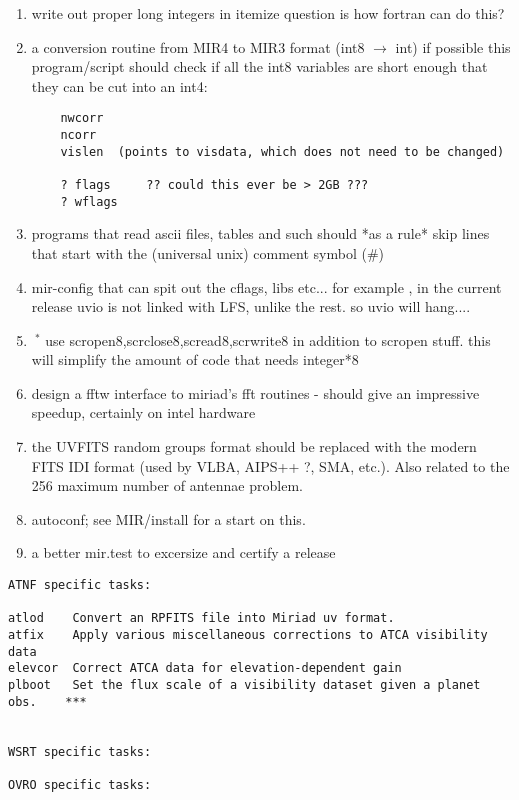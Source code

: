 \begin{enumerate}
\item
write out proper long integers in itemize
question is how fortran can do this?

\item
a conversion routine from MIR4 to MIR3 format (int8 $\rightarrow$ int) if possible
this program/script should check if all the int8 variables are short
enough that they can be cut into an int4:

\begin{verbatim}
	nwcorr
	ncorr
	vislen	(points to visdata, which does not need to be changed)
	
	? flags		?? could this ever be > 2GB ???
	? wflags
\end{verbatim}

\item
programs that read ascii files, tables and such should *as a rule*
skip lines that start with the (universal unix) comment symbol (\#)

\item
mir-config that can spit out the cflags, libs etc...
for example , in the current release uvio  is not linked with LFS,
unlike the rest. so uvio will hang....

\item
$\ ^{*}$
use scropen8,scrclose8,scread8,scrwrite8 in addition to scropen stuff.
this will simplify the amount of code that needs integer*8



\item
design a fftw interface to miriad's fft routines - should give an impressive
speedup, certainly on intel hardware

\item
the UVFITS random groups format should be replaced with the modern
FITS IDI format (used by VLBA, AIPS++ ?, SMA, etc.). Also related
to the 256 maximum number of antennae problem.

\item
autoconf; see MIR/install for a start on this.

\item
a better mir.test to excersize and certify a release

\end{enumerate}

\begin{verbatim}
ATNF specific tasks:

atlod    Convert an RPFITS file into Miriad uv format.
atfix    Apply various miscellaneous corrections to ATCA visibility data  
elevcor  Correct ATCA data for elevation-dependent gain
plboot   Set the flux scale of a visibility dataset given a planet obs.    ***


WSRT specific tasks:

OVRO specific tasks:
\end{verbatim}

